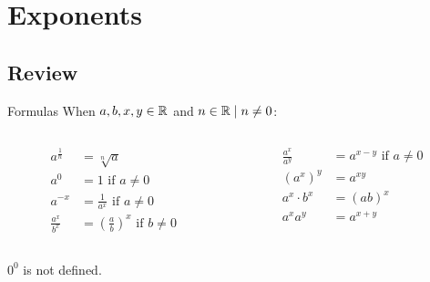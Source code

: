 \section{Exponents}
\subsection{Review}
\begin{namedframe}{Formulas}
	When $a, b, x, y \in \mathbb{R}$ and $n \in \mathbb{R} \mid n \neq 0$:
	\begin{columns}
		\begin{column}{0.5\textwidth}
			\begin{align*}
				a^{\frac{1}{n}} &= \sqrt[n]{a}\\
				a^0             &= 1 \text{ if } a \neq 0\\
				a^{-x}          &= \frac{1}{a^x} \text{ if } a \neq 0\\
				\frac{a^x}{b^x} &= \left( \frac{a}{b} \right)^x \text{ if } b \neq 0
			\end{align*}
		\end{column}
		\begin{column}{0.5\textwidth}
			\begin{align*}
				\frac{a^x}{a^y}       &= a^{x-y} \text{ if } a \neq 0\\
				\left( a^x \right)^ y &= a^{xy}\\
				a^x \cdot b^x         &= (ab)^x\\
				a^x a^y               &= a^{x + y}
			\end{align*}
		\end{column}
	\end{columns}
	$0^0$ is not defined.
\end{namedframe}
